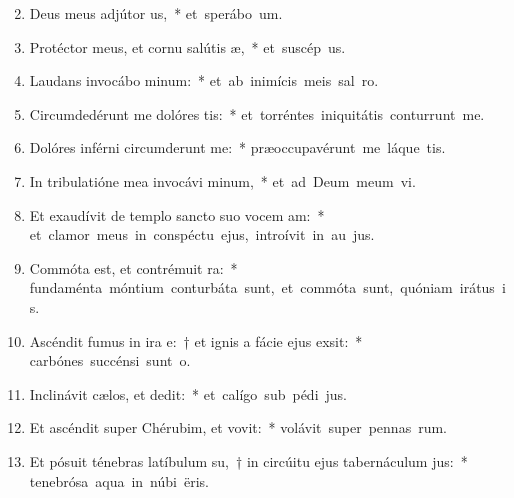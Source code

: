 \begin{flushleft}
\begin{enumerate}[leftmargin=*]
\setcounter{enumi}{1}

\item Deus meus adjútor us,~* \mbox{et sperábo  um.}

\item Protéctor meus, et cornu salútis æ,~* \mbox{et suscép us.}

\item Laudans invocábo minum:~* \mbox{et ab inimícis meis sal ro.}

\item Circumdedérunt me dolóres tis:~* \mbox{et torréntes iniquitátis conturrunt me.}

\item Dolóres inférni circumderunt me:~* \mbox{præoccupavérunt me láque tis.}

\item In tribulatióne mea invocávi minum,~* \mbox{et ad Deum meum vi.}

\item Et exaudívit de templo sancto suo vocem am:~* \mbox{et clamor meus in conspéctu ejus, introívit in au jus.}

\item Commóta est, et contrémuit ra:~* \mbox{fundaménta móntium conturbáta sunt, et commóta sunt, quóniam irátus  is.}

\item Ascéndit fumus in ira e:~† et ignis a fácie ejus exsit:~* \mbox{carbónes succénsi sunt  o.}

\item Inclinávit cælos, et dedit:~* \mbox{et calígo sub pédi jus.}

\item Et ascéndit super Chérubim, et vovit:~* \mbox{volávit super pennas rum.}

\item Et pósuit ténebras latíbulum su,~† in circúitu ejus tabernáculum jus:~* \mbox{tenebrósa aqua in núbi ëris.}


\end{enumerate}
\end{flushleft}
